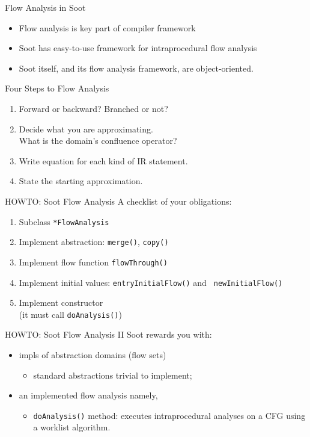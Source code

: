 \begin{slide}{Flow Analysis in Soot}
\vspace*{0.2in}
\begin{itemize}
\item Flow analysis is key part of compiler framework
\item Soot has easy-to-use framework for intraprocedural flow analysis
\item Soot itself, and its flow analysis framework, are object-oriented.
\end{itemize}
\end{slide}

\begin{slide}{Four Steps to Flow Analysis}
\begin{enumerate}
\item Forward or backward?  Branched or not?

\item Decide what you are approximating.\\
What is the domain's confluence operator?

\item Write equation for each kind of IR statement.

\item State the starting approximation.
\end{enumerate}
\end{slide}

\begin{slide}{HOWTO: Soot Flow Analysis}
A checklist of your obligations:
\begin{enumerate}
\item Subclass \verb+*FlowAnalysis+
\item Implement abstraction: {\tt merge()}, {\tt copy()}
\item Implement flow function {\tt flowThrough()}
\item Implement initial values: {\tt entryInitialFlow()} and {\tt
newInitialFlow()}
\item Implement constructor \\ \quad (it must call {\tt doAnalysis()})
\end{enumerate}
\end{slide}

\begin{slide}{HOWTO: Soot Flow Analysis II}
Soot rewards you with:
\begin{itemize}
\item impls of abstraction domains (flow sets)
\begin{itemize}
\item standard abstractions trivial to implement;
\end{itemize}
\item an implemented flow analysis namely,
\begin{itemize}
\item {\tt doAnalysis()} method:
executes intraprocedural analyses on a
CFG using a worklist algorithm.
\end{itemize}
\end{itemize}
\end{slide}


